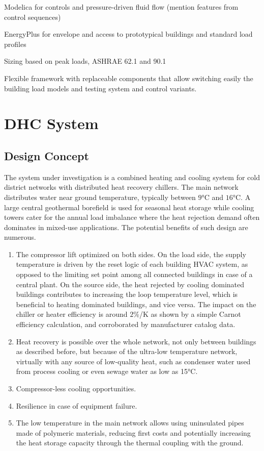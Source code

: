 Modelica for controls and pressure-driven fluid flow (mention features from control sequences)

EnergyPlus for envelope and access to prototypical buildings and standard load profiles

Sizing based on peak loads, ASHRAE 62.1 and 90.1

Flexible framework with replaceable components that allow switching easily the building load models and testing system and control variants.


\section{DHC System} \label{sec:dhc}

\subsection{Design Concept} \label{sec:concept}

The system under investigation is a combined heating and cooling system for cold district networks with distributed heat recovery chillers. The main network distributes water near ground temperature, typically between $9$°C and $16$°C. A large central geothermal borefield is used for seasonal heat storage while cooling towers cater for the annual load imbalance where the heat rejection demand often dominates in mixed-use applications.
The potential benefits of such design are numerous.

\begin{enumerate}

    \item The compressor lift optimized on both sides. On the load side, the supply temperature is driven by the reset logic of each building HVAC system, as opposed to the limiting set point among all connected buildings in case of a central plant. On the source side, the heat rejected by cooling dominated buildings contributes to increasing the loop temperature level, which is beneficial to heating dominated buildings, and vice versa. The impact on the chiller or heater efficiency is around $2$\%/K as shown by a simple Carnot efficiency calculation, and corroborated by manufacturer catalog data.

    \item Heat recovery is possible over the whole network, not only between buildings as described before, but because of the ultra-low temperature network, virtually with any source of low-quality heat, such as condenser water used from process cooling or even sewage water as low as 15°C.

    \item Compressor-less cooling opportunities.

    \item Resilience in case of equipment failure.

    \item The low temperature in the main network allows using uninsulated pipes made of polymeric materials, reducing first costs and potentially increasing the heat storage capacity through the thermal coupling with the ground.

\end{enumerate}

